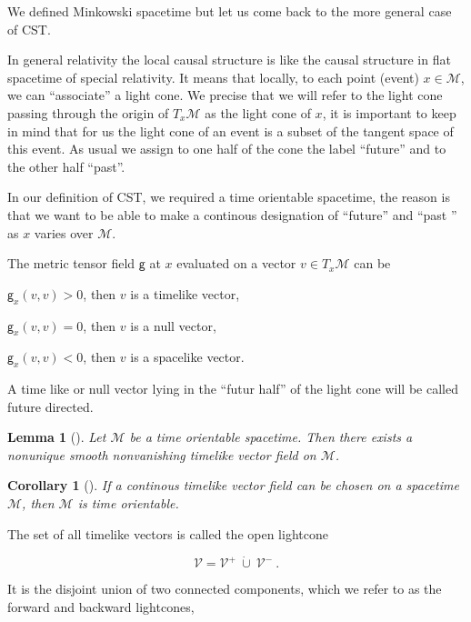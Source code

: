 \documentclass[11pt]{book}
\newcommand{\Mcal}{\mathcal{M}}
\newcommand{\Vcal}{\mathcal{V}}
\newcommand{\gsf}{\mathsf{g}}
\theoremstyle{break}
\newtheorem{lemma}{Lemma}
\newtheorem{corollary}{Corollary}
\begin{document}
We defined Minkowski spacetime but let us come back to the more general case of CST. \par

In general relativity the local causal structure is like the causal structure in flat spacetime of special relativity. It means that locally, to each point (event) $x\in\Mcal$, we can ``associate'' a light cone. We precise that we will refer to the light cone passing through the origin of $T_x\Mcal$ as the light cone of $x$, it is important to keep in mind that for us the light cone of an event is a subset of the tangent space of this event.
As usual we assign to one half of the cone the label ``future'' and to the other half ``past''. \par

In our definition of CST, we required a time orientable spacetime, the reason is that we want to be able to make a continous designation of ``future'' and ``past '' as $x$ varies over $\Mcal$. \par

The metric tensor field $\gsf$ at $x$ evaluated on a vector $v \in T_x\Mcal$ can be
\begin{description}
 \item $\gsf_x(v,v) > 0$, then $v$ is a timelike vector,
 \item $\gsf_x(v,v) = 0$, then $v$ is a null vector,
 \item $\gsf_x(v,v) < 0$, then $v$ is a spacelike vector.
\end{description}
A time like or null vector lying in the ``futur half'' of the light cone will be called future directed.

\begin{lemma}[]
Let $\Mcal$ be a time orientable spacetime. Then there exists a nonunique smooth nonvanishing timelike vector field on $\Mcal$.
\end{lemma}

\begin{corollary}[]
If a continous timelike vector field can be chosen on a spacetime $\Mcal$, then $\Mcal$ is time orientable.
\end{corollary}

The set of all timelike vectors is called the open lightcone 

\begin{equation*}
 \Vcal=\Vcal^{+} \ \dot{\cup} \ \Vcal^{-} \ . 
\end{equation*}

It is the disjoint union of two connected components, which we refer to as the forward and backward lightcones, 
\end{document}
